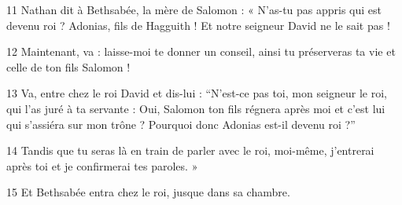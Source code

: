
11 Nathan dit à Bethsabée, la mère de Salomon : « N’as-tu pas appris qui est devenu roi ? Adonias, fils de Hagguith ! Et notre seigneur David ne le sait pas !

12 Maintenant, va : laisse-moi te donner un conseil, ainsi tu préserveras ta vie et celle de ton fils Salomon !

13 Va, entre chez le roi David et dis-lui : “N’est-ce pas toi, mon seigneur le roi, qui l’as juré à ta servante : Oui, Salomon ton fils régnera après moi et c’est lui qui s’assiéra sur mon trône ? Pourquoi donc Adonias est-il devenu roi ?”

14 Tandis que tu seras là en train de parler avec le roi, moi-même, j’entrerai après toi et je confirmerai tes paroles. »

15 Et Bethsabée entra chez le roi, jusque dans sa chambre.